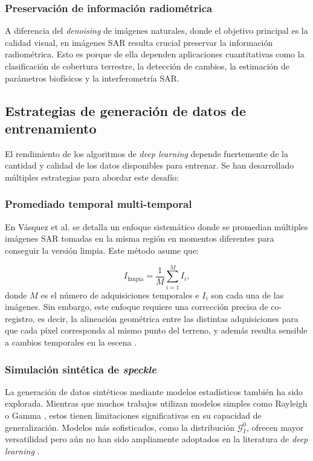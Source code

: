 \subsubsection{Preservación de información radiométrica}

A diferencia del \emph{denoising} de imágenes naturales, donde el objetivo principal es la calidad visual, en imágenes SAR resulta crucial preservar la información radiométrica. Esto es porque de ella dependen aplicaciones cuantitativas como la clasificación de cobertura terrestre, la detección de cambios, la estimación de parámetros biofísicos y la interferometría SAR.

\subsection{Estrategias de generación de datos de entrenamiento}

El rendimiento de los algoritmos de \emph{deep learning} depende fuertemente de la cantidad y calidad de los datos disponibles para entrenar. Se han desarrollado múltiples estrategias para abordar este desafío:

\subsubsection{Promediado temporal multi-temporal}

En Vásquez et al. \cite{vasquez2024labeled} se detalla un enfoque sistemático donde se promedian múltiples imágenes SAR tomadas en la misma región en momentos diferentes para conseguir la versión limpia. Este método asume que:

\begin{equation}
	I_{\text{limpia}} = \frac{1}{M}\sum_{i=1}^{M} I_i,
\end{equation}
donde $M$ es el número de adquisiciones temporales e $I_i$ son cada una de las imágenes. Sin embargo, este enfoque requiere una corrección precisa de co-registro, es decir, la alineación geométrica entre las distintas adquisiciones para que cada píxel corresponda al mismo punto del terreno, y además resulta sensible a cambios temporales en la escena \cite{schmitt2019potential}.

\subsubsection{Simulación sintética de \emph{speckle}}

La generación de datos sintéticos mediante modelos estadísticos también ha sido explorada. Mientras que muchos trabajos utilizan modelos simples como Rayleigh o Gamma \cite{lattari2019deep}, estos tienen limitaciones significativas en su capacidad de generalización. Modelos más sofisticados, como la distribución $\mathcal{G}_I^0$, ofrecen mayor versatilidad pero aún no han sido ampliamente adoptados en la literatura de \emph{deep learning} \cite{yue2020sar}.

